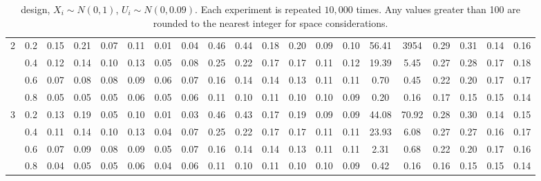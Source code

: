 \begin{table}
\begin{threeparttable}
\begin{tabular}{c c|c c c c c c|c c c c c c|c c c c c c}
\multirow{4}{*}{2} & 0.2 & 0.15 & 0.21 & 0.07 & 0.11 & 0.01 & 0.04 & 0.46 & 0.44 & 0.18 & 0.20 & 0.09 & 0.10 & 56.41 & 3954 & 0.29 & 0.31 & 0.14 & 0.16 \\
& 0.4 & 0.12 & 0.14 & 0.10 & 0.13 & 0.05 & 0.08 & 0.25 & 0.22 & 0.17 & 0.17 & 0.11 & 0.12 & 19.39 & 5.45 & 0.27 & 0.28 & 0.17 & 0.18 \\
& 0.6 & 0.07 & 0.08 & 0.08 & 0.09 & 0.06 & 0.07 & 0.16 & 0.14 & 0.14 & 0.13 & 0.11 & 0.11 & 0.70 & 0.45 & 0.22 & 0.20 & 0.17 & 0.17 \\
& 0.8 & 0.05 & 0.05 & 0.05 & 0.06 & 0.05 & 0.06 & 0.11 & 0.10 & 0.11 & 0.10 & 0.10 & 0.09 & 0.20 & 0.16 & 0.17 & 0.15 & 0.15 & 0.14 \\
\hline
\multirow{4}{*}{3} & 0.2 & 0.13 & 0.19 & 0.05 & 0.10 & 0.01 & 0.03 & 0.46 & 0.43 & 0.17 & 0.19 & 0.09 & 0.09 & 44.08 & 70.92 & 0.28 & 0.30 & 0.14 & 0.15 \\
& 0.4 & 0.11 & 0.14 & 0.10 & 0.13 & 0.04 & 0.07 & 0.25 & 0.22 & 0.17 & 0.17 & 0.11 & 0.11 & 23.93 & 6.08 & 0.27 & 0.27 & 0.16 & 0.17 \\
& 0.6 & 0.07 & 0.09 & 0.08 & 0.09 & 0.05 & 0.07 & 0.16 & 0.14 & 0.14 & 0.13 & 0.11 & 0.11 & 2.31 & 0.68 & 0.22 & 0.20 & 0.17 & 0.16 \\
& 0.8 & 0.04 & 0.05 & 0.05 & 0.06 & 0.04 & 0.06 & 0.11 & 0.10 & 0.11 & 0.10 & 0.10 & 0.09 & 0.42 & 0.16 & 0.16 & 0.15 & 0.15 & 0.14 \\
\hline
\hline
\end{tabular}
\caption*{\citet{lee2008randomized} design, $X_i \sim N(0,1)$, $U_i \sim N(0,0.09)$. Each experiment is repeated $10,000$ times. Any values greater than 100 are rounded to the nearest integer for space considerations.}
\label{table estimation lee normal}
\end{threeparttable}
\end{table}
